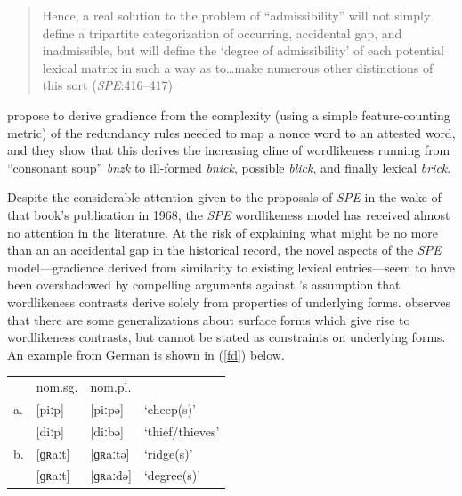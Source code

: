 \begin{quote}
Hence, a real solution to the problem of ``admissibility'' will not simply define a tripartite categorization of occurring, accidental gap, and inadmissible, but will define the `degree of admissibility' of each potential lexical matrix in such a way as to\ldots{}make numerous other distinctions of this sort (\emph{SPE}:416--417)
\end{quote}


\citeauthor{SPE} propose to derive gradience from the complexity (using a simple feature-counting metric) of the redundancy rules needed to map a nonce word to an attested word, and they show that this derives the increasing cline of wordlikeness running from ``consonant soup'' \emph{bnzk} to ill-formed \emph{bnick}, possible \emph{blick}, and finally lexical \emph{brick}.

Despite the considerable attention given to the proposals of \emph{SPE} in the wake of that book's publication in 1968, the \emph{SPE} wordlikeness model has received almost no attention in the literature. At the risk of explaining what might be no more than an an accidental gap in the historical record, the novel aspects of the \emph{SPE} model---gradience derived from similarity to existing lexical entries---seem to have been overshadowed by compelling arguments against \citeauthor{SPE}'s assumption \citep[see also][]{Halle1962,Stanley1967} that wordlikeness contrasts derive solely from properties of underlying forms. \citet{Shibatani1973} observes that there are some generalizations about surface forms which give rise to wordlikeness contrasts, but cannot be stated as constraints on underlying forms. An example from German is shown in (\ref{fd}) below.

\begin{example} \label{fd}
\begin{tabular}{l l l l}
   & nom.sg. & nom.pl.    \\
a. & [piːp]    & [piːpə]  & `cheep(s)'      \\
   & [diːp]    & [diːbə]  & `thief/thieves' \\
b. & [ɡʀaːt]   & [ɡʀaːtə] & `ridge(s)'      \\
   & [ɡʀaːt]   & [ɡʀaːdə] & `degree(s)'     \\
\end{tabular}
\end{example}

